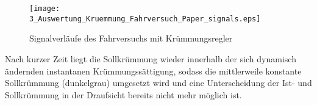 	\begin{figure}[ht]
	\centering
	
	\renewcommand{\matlabtextA}{\scriptsize}
	\def\xlabel{$t$ in \unit{s}}
	\def\ylabelA{$\delta$ in \unit{rad}}	
	\def\ylabelB{$v_v$ in \unitfrac{m}{s}}	
	\def\ylabelC{$\Delta\psi$ in \unit{rad}}		
	\def\ylabelD{$\kappa_t$ in \unit{m$^{-1}$}}	
	\def\ylabelE{$e_\kappa$ in \unit{m$^{-1}$}}		
	
	\renewcommand{\matlabtextA}{\scriptsize}
  \texttt{[image: 3\_Auswertung\_Kruemmung\_Fahrversuch\_Paper\_signals.eps]}
    \caption[Signalverläufe des Fahrversuchs mit Krümmungsregler] {Signalverläufe des Fahrversuchs mit Krümmungsregler }
    \label{fig:Auswertung_Kruemmung_Fahrversuch}
	\end{figure}
%	

Nach kurzer Zeit liegt die Sollkrümmung wieder innerhalb der sich dynamisch ändernden instantanen Krümmungssättigung, sodass die mittlerweile konstante Sollkrümmung (dunkelgrau) umgesetzt wird und eine Unterscheidung der Ist- und Sollkrümmung in der Draufsicht bereits nicht mehr möglich ist.

